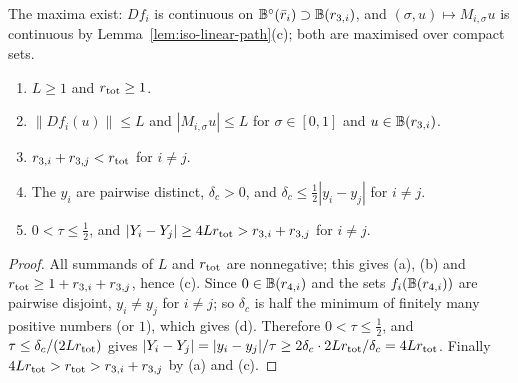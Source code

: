 The maxima exist: $Df_i$ is continuous on $\mathbb{B}^\circ(\bar r_i)\supset\mathbb{B}(r_{3,i})$, and $(\sigma,u)\mapsto M_{i,\sigma}u$ is
continuous by Lemma~\ref{lem:iso-linear-path}(c); both are maximised over compact sets.

\begin{lemma}[Parameters]\label{lem:iso-parameters}
\begin{enumerate}[label=(\alph*)]
\item $L\ge1$ and $r_{\rm tot}\ge1$.
\item $\|Df_i(u)\|\le L$ and $|M_{i,\sigma}u|\le L$ for $\sigma\in[0,1]$ and $u\in\mathbb{B}(r_{3,i})$.
\item $r_{3,i}+r_{3,j}<r_{\rm tot}$ for $i\ne j$.
\item The $y_i$ are pairwise distinct, $\delta_c>0$, and $\delta_c\le\frac12|y_i-y_j|$ for $i\ne j$.
\item $0<\tau\le\frac12$, and $|Y_i-Y_j|\ge4Lr_{\rm tot}>r_{3,i}+r_{3,j}$ for $i\ne j$.
\end{enumerate}
\end{lemma}

\begin{proof}
All summands of $L$ and $r_{\rm tot}$ are nonnegative; this gives (a), (b) and $r_{\rm tot}\ge1+r_{3,i}+r_{3,j}$, hence (c).
Since $0\in\mathbb{B}(r_{4,i})$ and the sets $f_i(\mathbb{B}(r_{4,i}))$ are pairwise disjoint, $y_i\ne y_j$ for $i\ne j$; so $\delta_c$ is half the
minimum of finitely many positive numbers (or $1$), which gives (d). Therefore $0<\tau\le\frac12$, and
$\tau\le\delta_c/(2Lr_{\rm tot})$ gives $|Y_i-Y_j|=|y_i-y_j|/\tau\ge2\delta_c\cdot2Lr_{\rm tot}/\delta_c=4Lr_{\rm tot}$. Finally
$4Lr_{\rm tot}>r_{\rm tot}>r_{3,i}+r_{3,j}$ by (a) and (c).
\end{proof}

